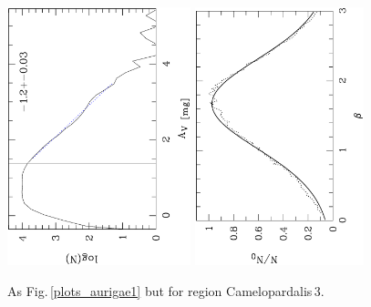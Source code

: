 \documentclass[useAMS,usenatbib]{mn2e}
\begin{document}
\begin{appendix}
\begin{figure}
\includegraphics[height=7.5cm,angle=-90]{av_dist_chameleopardalis3.ps}
\hfill
\includegraphics[height=7.5cm,angle=-90]{histo_chameleopardalis3.ps}
\caption{\label{plots_chameleopardalis3} As Fig.\,\ref{plots_aurigae1} but for
region Camelopardalis\,3.}   
\end{figure}


\end{appendix}
\end{document}
